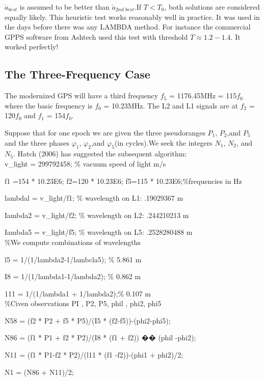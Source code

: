 $\check{a}_{best}$ is assumed to be better than $\check{a}_{2nd\,\,best}$.If $T<T_{0}$, both solutions are considered equally likely. This heuristic test works reasonably well in practice. It was used in the days before there was any LAMBDA method. For instance the commercial GPPS software from Ashtech used this test with threshold $T\approx1.2-1.4$. It worked perfectly!

\subsection{The Three-Frequency Case}

The modernized GPS will have a third frequency $f_{5}$ = 1176.45MHz = 115$f_{0}$ where the basic frequency is $f_{0}$ = 10.23MHz. The L2 and L1 signals are at $f_{2}$ = 120$f_{0}$ and $f_{1}$ = 154$f_{0}$.

Suppose that for one epoch we are given the three pseudoranges $P_{1}$, $P_{2}$,and $P_{5}$ and the three phases $\varphi_{1}$, $\varphi_{2}$,and $\varphi_{5}$(in cycles).We seek the integers $N_{1}$, $N_{2}$, and $N_{5}$. Hatch (2006) has suggested the subsequent algorithm:\\

v\_light = 299792458; \% vacuum speed of light m/s

f1 =154 * 10.23E6; f2=120 * 10.23E6; f5=115 * 10.23E6;\%frequencies in Hz

lambdal = v\_light/f1; \% wavelength on L1: .19029367 m

Iambda2 = v\_light/f2; \% wavelength on L2: .244210213 m

Iambda5 = v\_light/f5; \% wavelength on L5: .2528280488 m\\

\%We compute combinations of wavelengths

l5 = 1/(1/lambda2-1/lambcla5); \% 5.861 m

I8 = 1/(1/lambda1-1/lambda2); \% 0.862 m

111 = 1/(1/lambda1 + 1/lambda2);\% 0.107 m\\

\%Civen observations PI , P2, P5, phil , phi2, phi5

N58 = (f2 * P2 + f5 * P5)/(I5 * (f2-f5))-(phi2-phi5);

N86 = (f1 * P1 + f2 * P2)/(I8 * (f1 + f2)) �� (phil -phi2);

N11 = (f1 * P1-f2 * P2)/(l11 * (f1 -f2))-(phi1 + phi2)/2;

N1 = (N86 + N11)/2;

